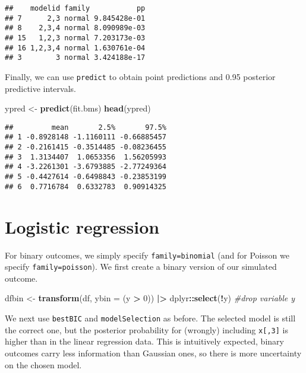 \documentclass[
]{book}
\newenvironment{Shaded}{\begin{snugshade}}{\end{snugshade}}
\newcommand{\AttributeTok}[1]{\textcolor[rgb]{0.13,0.29,0.53}{#1}}
\newcommand{\CommentTok}[1]{\textcolor[rgb]{0.56,0.35,0.01}{\textit{#1}}}
\newcommand{\DecValTok}[1]{\textcolor[rgb]{0.00,0.00,0.81}{#1}}
\newcommand{\FunctionTok}[1]{\textcolor[rgb]{0.13,0.29,0.53}{\textbf{#1}}}
\newcommand{\NormalTok}[1]{#1}
\newcommand{\OtherTok}[1]{\textcolor[rgb]{0.56,0.35,0.01}{#1}}
\newcommand{\SpecialCharTok}[1]{\textcolor[rgb]{0.81,0.36,0.00}{\textbf{#1}}}
\theoremstyle{definition}
\theoremstyle{definition}
\theoremstyle{definition}
\theoremstyle{definition}
\theoremstyle{remark}
\begin{document}
\begin{verbatim}
##    modelid family           pp
## 7      2,3 normal 9.845428e-01
## 8    2,3,4 normal 8.090989e-03
## 15   1,2,3 normal 7.203173e-03
## 16 1,2,3,4 normal 1.630761e-04
## 3        3 normal 3.424188e-17
\end{verbatim}

Finally, we can use \texttt{predict} to obtain point predictions and 0.95 posterior predictive intervals.

\begin{Shaded}
\begin{Highlighting}[]
\NormalTok{ypred }\OtherTok{\textless{}{-}} \FunctionTok{predict}\NormalTok{(fit.bms)}
\FunctionTok{head}\NormalTok{(ypred)}
\end{Highlighting}
\end{Shaded}

\begin{verbatim}
##         mean       2.5%       97.5%
## 1 -0.8928148 -1.1160111 -0.66885457
## 2 -0.2161415 -0.3514485 -0.08236455
## 3  1.3134407  1.0653356  1.56205993
## 4 -3.2261301 -3.6793885 -2.77249364
## 5 -0.4427614 -0.6498843 -0.23853199
## 6  0.7716784  0.6332783  0.90914325
\end{verbatim}

\section{Logistic regression}\label{logistic-regression}

For binary outcomes, we simply specify \texttt{family=\textquotesingle{}binomial\textquotesingle{}} (and for Poisson we specify \texttt{family=\textquotesingle{}poisson\textquotesingle{}}).
We first create a binary version of our simulated outcome.

\begin{Shaded}
\begin{Highlighting}[]
\NormalTok{dfbin }\OtherTok{\textless{}{-}} \FunctionTok{transform}\NormalTok{(df, }\AttributeTok{ybin =}\NormalTok{ (y }\SpecialCharTok{\textgreater{}} \DecValTok{0}\NormalTok{)) }\SpecialCharTok{|\textgreater{}}
\NormalTok{  dplyr}\SpecialCharTok{::}\FunctionTok{select}\NormalTok{(}\SpecialCharTok{!}\NormalTok{y) }\CommentTok{\#drop variable y}
\end{Highlighting}
\end{Shaded}

We next use \texttt{bestBIC} and \texttt{modelSelection} as before. The selected model is still the correct one, but the posterior probability for (wrongly) including \texttt{x{[},3{]}} is higher than in the linear regression data. This is intuitively expected, binary outcomes carry less information than Gaussian ones, so there is more uncertainty on the chosen model.
\end{document}
